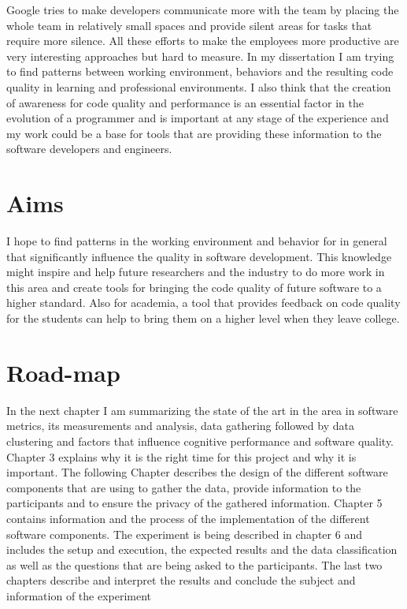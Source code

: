Google tries to make developers communicate more with the team by placing the whole team in relatively small spaces and provide silent areas for tasks that require more silence. 
All these efforts to make the employees more productive are very interesting approaches but hard to measure. 
\bigbreak
In my dissertation I am trying to find patterns between working environment, behaviors and the resulting code quality in learning and professional environments. I also think that the creation of awareness for code quality and performance is an essential factor in the evolution of a programmer and is important at any stage of the experience and my work could be a base for tools that are providing these information to the software developers and engineers. 

\section{Aims}
I hope to find patterns in the working environment and behavior for in general that significantly influence the quality in software development.
This knowledge might inspire and help future researchers and the industry to do more work in this area and create tools for bringing the code quality of future software to a higher standard. 
Also for academia, a tool that provides feedback on code quality for the students can help to bring them on a higher level when they leave college. 

\section{Road-map}
In the next chapter I am summarizing the state of the art in the area in software metrics, its measurements and analysis, data gathering followed by data clustering and factors that influence cognitive performance and software quality. 
Chapter 3 explains why it is the right time for this project and why it is important. 
The following Chapter describes the design of the different software components that are using to gather the data, provide information to the participants and to ensure the privacy of the gathered information. 
Chapter 5 contains information and the process of the implementation of the different software components. 
The experiment is being described in chapter 6 and includes the setup and execution, the expected results and the data classification as well as the questions that are being asked to the participants. 
The last two chapters describe and interpret the results and conclude the subject and information of the experiment

